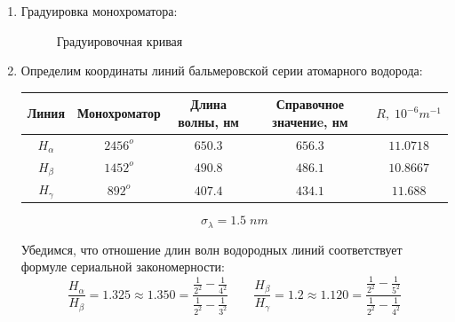 \documentclass[a4paper,12pt]{article}
\begin{document}
	\begin{enumerate}
		\item Градуировка монохроматора:
		
		\begin{figure}[ht!]\label{grade} 
			\caption{Градуировочная кривая}
		\end{figure}
		
		\item Определим координаты линий бальмеровской серии атомарного водорода:
		
		
		\begin{center}
			\begin{tabular}{|c|c|c|c|c|}
				\hline
				Линия & Монохроматор & Длина волны, нм & Справочное значениe, нм & $R, \; 10^{-6}m^{-1}$\\ \hline
				$H_\alpha$ & $2456^o$ & $ 650.3 $ & $ 656.3 $ & $11.0718$ \\ \hline
				$H_\beta$ & $1452^o$ & $ 490.8 $ & $ 486.1$ & $10.8667$ \\ \hline
				$H_\gamma$ & $892^o$ & $407.4 $ & $ 434.1$ & $11.688$ \\ \hline
			\end{tabular}
		\end{center}
		\[\sigma_\lambda = 1.5 \; nm \]
		
		Убедимся, что отношение длин волн водородных линий соответствует формуле сериальной закономерности:
		\[
		\dfrac{H_\alpha}{H_\beta} = 1.325 \approx 1.350 = \dfrac{\frac{1}{2^2}-\frac{1}{4^2}}{\frac{1}{2^2}-\frac{1}{3^2}}
		\qquad
		\dfrac{H_\beta}{H_\gamma} = 1.2 \approx 1.120 = \dfrac{\frac{1}{2^2}-\frac{1}{5^2}}{\frac{1}{2^2}-\frac{1}{4^2}}
		\]
		

\end{enumerate}
\end{document}
